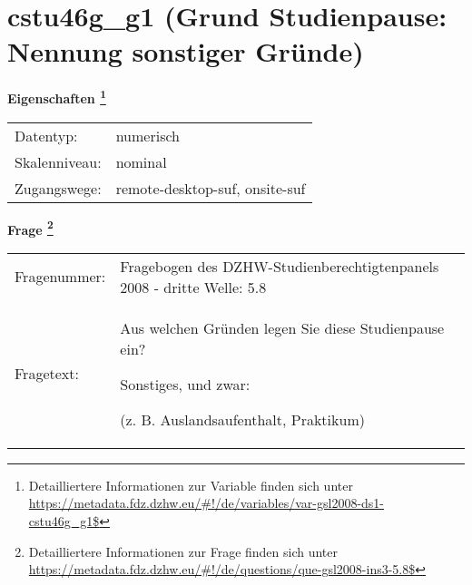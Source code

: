 
    \setcounter{footnote}{0}

    \vspace*{-1.8cm}
	\section{cstu46g\_g1 (Grund Studienpause: Nennung sonstiger Gründe)}
	\label{section:cstu46g_g1}



    \vspace*{0.5cm}
    \noindent\textbf{Eigenschaften
	\footnote{Detailliertere Informationen zur Variable finden sich unter
		\url{https://metadata.fdz.dzhw.eu/\#!/de/variables/var-gsl2008-ds1-cstu46g_g1$}}}\\
	\begin{tabularx}{\hsize}{@{}lX}
	Datentyp: & numerisch \\
	Skalenniveau: & nominal \\
	Zugangswege: &
	  remote-desktop-suf, 
	  onsite-suf
 \\
    \end{tabularx}



				\vspace*{0.5cm}
                \noindent\textbf{Frage
	                \footnote{Detailliertere Informationen zur Frage finden sich unter
		              \url{https://metadata.fdz.dzhw.eu/\#!/de/questions/que-gsl2008-ins3-5.8$}}}\\
				\begin{tabularx}{\hsize}{@{}lX}
					Fragenummer: &
					  Fragebogen des DZHW-Studienberechtigtenpanels 2008 - dritte Welle:
					  5.8
 \\
					Fragetext: & Aus welchen Gründen legen Sie diese Studienpause ein?\par  Sonstiges, und zwar:\par  (z. B. Auslandsaufenthalt, Praktikum) \\
				\end{tabularx}





